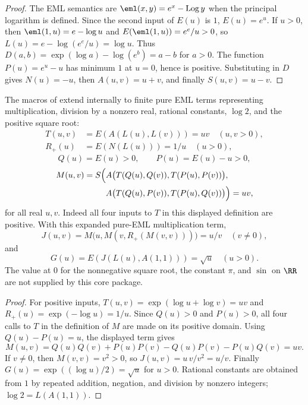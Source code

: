 \begin{proof}
The EML semantics are \(\eml(x,y)=e^x-\operatorname{Log}y\) when the principal
logarithm is defined.  Since the second input of \(E(u)\) is \(1\),
\(E(u)=e^u\).  If \(u>0\), then \(\eml(1,u)=e-\log u\) and \(E(\eml(1,u))=e^e/u>0\), so
\(L(u)=e-\log(e^e/u)=\log u\).  Thus
\(D(a,b)=\exp(\log a)-\log(e^b)=a-b\) for \(a>0\).  The function
\(P(u)=e^u-u\) has minimum \(1\) at \(u=0\), hence is positive.  Substituting in
\(D\) gives \(N(u)=-u\), then \(A(u,v)=u+v\), and finally \(S(u,v)=u-v\).
\end{proof}

\begin{theorem}
\label{lem:eml-real-witness-library}
The macros of  extend internally to finite pure EML
terms representing multiplication, division by a nonzero real, rational
constants, \(\log2\), and the positive square root:
\[
\begin{aligned}
  T(u,v)&=E(A(L(u),L(v)))=uv\quad(u,v>0),\\
  R_+(u)&=E(N(L(u)))=1/u\quad(u>0),
\end{aligned}
\]
\[
  Q(u)=E(u)>0,
  \qquad P(u)=E(u)-u>0,
\]
\[
\begin{aligned}
  M(u,v)=S\Bigl(&A\bigl(T(Q(u),Q(v)),T(P(u),P(v))\bigr),\\
  &A\bigl(T(Q(u),P(v)),T(P(u),Q(v))\bigr)\Bigr)=uv,
\end{aligned}
\]
for all real \(u,v\).  Indeed all four inputs to \(T\) in this displayed
definition are positive.  With this expanded pure-EML multiplication term,
\[
  J(u,v)=M\bigl(u,M(v,R_+(M(v,v)))\bigr)=u/v\quad(v\ne0),
\]
and
\[
  G(u)=E(J(L(u),A(1,1)))=\sqrt u\quad(u>0).
\]
The value at \(0\) for the nonnegative square root, the constant \(\pi\), and
\(\sin\) on \(\RR\) are not supplied by this core package.
\end{theorem}

\begin{proof}
For positive inputs, \(T(u,v)=\exp(\log u+\log v)=uv\) and
\(R_+(u)=\exp(-\log u)=1/u\).  Since \(Q(u)>0\) and \(P(u)>0\), all four calls
to \(T\) in the definition of \(M\) are made on its positive domain.  Using
\(Q(u)-P(u)=u\), the displayed term gives
\[
  M(u,v)=Q(u)Q(v)+P(u)P(v)-Q(u)P(v)-P(u)Q(v)=uv .
\]
If \(v\ne0\), then \(M(v,v)=v^2>0\), so
\(J(u,v)=u\,v/v^2=u/v\).  Finally
\(G(u)=\exp((\log u)/2)=\sqrt u\) for \(u>0\).  Rational constants are obtained
from \(1\) by repeated addition, negation, and division by nonzero integers;
\(\log2=L(A(1,1))\).
\end{proof}

